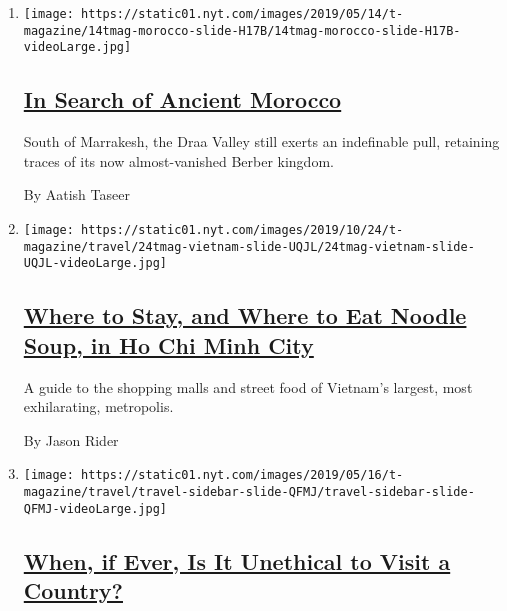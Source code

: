 \begin{enumerate}
\def\labelenumi{\arabic{enumi}.}
\item
  \texttt{[image: https://static01.nyt.com/images/2019/05/14/t-magazine/14tmag-morocco-slide-H17B/14tmag-morocco-slide-H17B-videoLarge.jpg]}

  \hypertarget{in-search-of-ancient-morocco}{%
  \subsection{\texorpdfstring{\href{/2019/05/15/t-magazine/morocco-travel-draa-valley.html}{In
  Search of Ancient
  Morocco}}{In Search of Ancient Morocco}}\label{in-search-of-ancient-morocco}}

  South of Marrakesh, the Draa Valley still exerts an indefinable pull,
  retaining traces of its now almost-vanished Berber kingdom.

  By Aatish Taseer
\item
  \texttt{[image: https://static01.nyt.com/images/2019/10/24/t-magazine/travel/24tmag-vietnam-slide-UQJL/24tmag-vietnam-slide-UQJL-videoLarge.jpg]}

  \hypertarget{where-to-stay-and-where-to-eat-noodle-soup-in-ho-chi-minh-city}{%
  \subsection{\texorpdfstring{\href{/2019/10/29/t-magazine/ho-chi-minh-city-travel-guide.html}{Where
  to Stay, and Where to Eat Noodle Soup, in Ho Chi Minh
  City}}{Where to Stay, and Where to Eat Noodle Soup, in Ho Chi Minh City}}\label{where-to-stay-and-where-to-eat-noodle-soup-in-ho-chi-minh-city}}

  A guide to the shopping malls and street food of Vietnam's largest,
  most exhilarating, metropolis.

  By Jason Rider
\item
  \texttt{[image: https://static01.nyt.com/images/2019/05/16/t-magazine/travel/travel-sidebar-slide-QFMJ/travel-sidebar-slide-QFMJ-videoLarge.jpg]}

  \hypertarget{when-if-ever-is-it-unethical-to-visit-a-country}{%
  \subsection{\texorpdfstring{\href{/2019/05/16/t-magazine/ethical-travel-reporting.html}{When,
  if Ever, Is It Unethical to Visit a
  Country?}}{When, if Ever, Is It Unethical to Visit a Country?}}\label{when-if-ever-is-it-unethical-to-visit-a-country}}


\end{enumerate}
